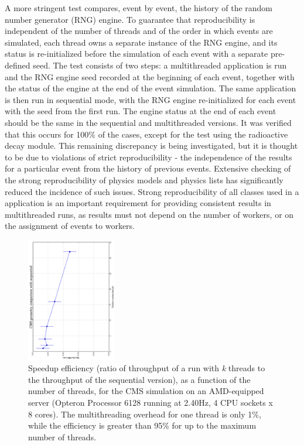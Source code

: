 A more stringent test compares, event by event, the history of the random number
generator (RNG) engine.  To guarantee that reproducibility is independent of the 
number of threads and of the order in which events are simulated, each thread 
owns a separate instance of the RNG engine, and its status is re-initialized 
before the simulation of each event with a separate pre-defined seed.  The test
consists of two steps: a multithreaded application is run and the RNG engine 
seed recorded at the beginning of each event, together with the status of the 
engine at the end of the event simulation.  The same application is then run in
sequential mode, with the RNG engine re-initialized for each event with the seed
from the first run.  The engine status at the end of each event should be the 
same in the sequential and multithreaded versions.  It was verified that this 
occurs for 100\% of the cases, except for the test using the radioactive decay 
module.  This remaining discrepancy is being investigated, but it is thought to 
be due to violations of strict reproducibility - the independence of the 
results for a particular \Gfour{} event from the history of previous events.  
Extensive checking of the strong reproducibility of \Gfour{} physics models and 
physics lists has significantly reduced the incidence of such issues.  Strong
reproducibility of all classes used in a \Gfour{} application is an important 
requirement for providing consistent results in multithreaded runs, as results 
must not depend on the number of workers, or on the assignment of events to 
workers.
\begin{figure}[htb]
    \includegraphics[width=0.35\textwidth, angle=-90]{figures/MTCPU.pdf}
  \caption{Speedup efficiency (ratio of throughput of a run with {\it k} threads
           to the throughput of the sequential version), as a function of the
           number of threads, for the CMS simulation on an AMD-equipped server
           (Opteron Processor 6128 running at 2.40Hz, 4 CPU sockets x 8 cores).
           The multithreading overhead for one thread is only 1\%, while the
           efficiency is greater than 95\% for up to the maximum number of
           threads.}
  \label{fig:MTcpu}
\end{figure}

